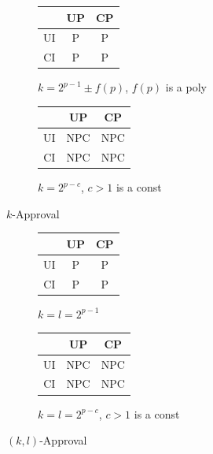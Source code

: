 {
	\begin{figure}
		\centering
    \begin{subfigure}[b]{0.45\textwidth}
			\centering
		  \begin{tabular}[0.45\textwidth]{ | c | c | c | }
		    \hline
		      & UP & CP \\
		    \hline
		    UI & P & P \\
		    \hline
		    CI & P & P \\
		    \hline
		  \end{tabular}
			\caption{\footnotesize $k=2^{p-1} \pm f(p)$, $f(p)$ is a poly}
		\end{subfigure}
    \begin{subfigure}[b]{0.45\textwidth}
			\centering
		  \begin{tabular}[0.45\textwidth]{ | c | c | c | }
		    \hline
		      & UP & CP \\
		    \hline
		    UI & NPC & NPC \\
		    \hline
		    CI & NPC & NPC \\
		    \hline
		  \end{tabular}
			\caption{\footnotesize $k=2^{p-c}$, $c>1$ is a const}
		\end{subfigure}
		\caption{$k$-Approval}
	\end{figure}
}

{
	\begin{figure}
		\centering
    \begin{subfigure}[b]{0.45\textwidth}
			\centering
		  \begin{tabular}[0.45\textwidth]{ | c | c | c | }
		    \hline
		      & UP & CP \\
		    \hline
		    UI & P & P \\
		    \hline
		    CI & P & P \\
		    \hline
		  \end{tabular}
			\caption{$k=l=2^{p-1}$}
		\end{subfigure}
    \begin{subfigure}[b]{0.45\textwidth}
			\centering
		  \begin{tabular}[0.45\textwidth]{ | c | c | c | }
		    \hline
		      & UP & CP \\
		    \hline
		    UI & NPC & NPC \\
		    \hline
		    CI & NPC & NPC \\
		    \hline
		  \end{tabular}
			\caption{\footnotesize $k=l=2^{p-c}$, $c>1$ is a const}
		\end{subfigure}
		\caption{$(k,l)$-Approval \footnotemark}
	\end{figure}


}

